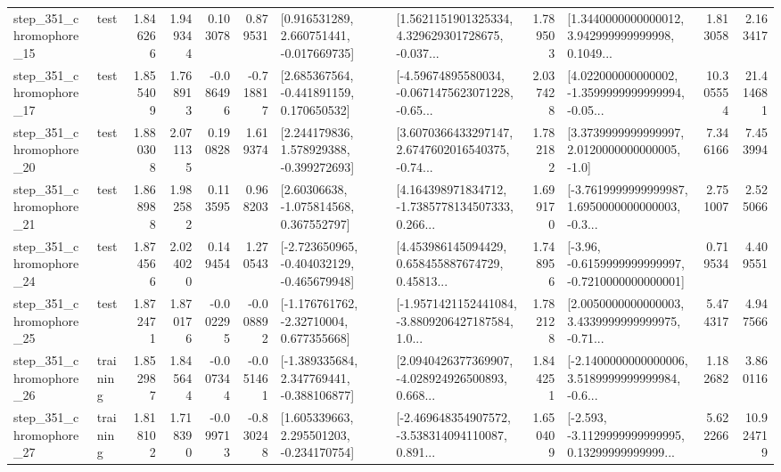 \begin{tabular}{llrrrrllrlrr}
  step\_351\_chromophore\_15 &      test &      1.846266 &    1.949344 &      0.103078 &  0.879531 &    [0.916531289, 2.660751441, -0.017669735] &  [1.5621151901325334, 4.329629301728675, -0.037... &       1.789503 &  [1.3440000000000012, 3.942999999999998, 0.1049... &            1.813058 &          2.163417 \\
  step\_351\_chromophore\_17 &      test &      1.855409 &    1.768913 &     -0.086496 & -0.718817 &    [2.685367564, -0.441891159, 0.170650532] &  [-4.59674895580034, -0.0671475623071228, -0.65... &       2.037428 &  [4.022000000000002, -1.3599999999999994, -0.05... &           10.305554 &         21.414681 \\
  step\_351\_chromophore\_20 &      test &      1.880308 &    2.071135 &      0.190828 &  1.619374 &    [2.244179836, 1.578929388, -0.399272693] &  [3.6070366433297147, 2.6747602016540375, -0.74... &       1.782182 &     [3.3739999999999997, 2.0120000000000005, -1.0] &            7.346166 &          7.453994 \\
  step\_351\_chromophore\_21 &      test &      1.868988 &    1.982582 &      0.113595 &  0.968203 &     [2.60306638, -1.075814568, 0.367552797] &  [4.164398971834712, -1.7385778134507333, 0.266... &       1.699170 &  [-3.7619999999999987, 1.6950000000000003, -0.3... &            2.751007 &          2.525066 \\
  step\_351\_chromophore\_24 &      test &      1.874566 &    2.024020 &      0.149454 &  1.270543 &  [-2.723650965, -0.404032129, -0.465679948] &  [4.453986145094429, 0.658455887674729, 0.45813... &       1.748956 &  [-3.96, -0.6159999999999997, -0.7210000000000001] &            0.719534 &          4.409551 \\
  step\_351\_chromophore\_25 &      test &      1.872471 &    1.870176 &     -0.002295 & -0.008892 &    [-1.176761762, -2.32710004, 0.677355668] &  [-1.9571421152441084, -3.8809206427187584, 1.0... &       1.782128 &  [2.0050000000000003, 3.4339999999999975, -0.71... &            5.474317 &          4.947566 \\
  step\_351\_chromophore\_26 &  training &      1.852987 &    1.845644 &     -0.007344 & -0.051461 &   [-1.389335684, 2.347769441, -0.388106877] &  [2.0940426377369907, -4.028924926500893, 0.668... &       1.844251 &  [-2.1400000000000006, 3.5189999999999984, -0.6... &            1.182682 &          3.860116 \\
  step\_351\_chromophore\_27 &  training &      1.818102 &    1.718390 &     -0.099713 & -0.830248 &    [1.605339663, 2.295501203, -0.234170754] &  [-2.469648354907572, -3.538314094110087, 0.891... &       1.650409 &  [-2.593, -3.1129999999999995, 0.13299999999999... &            5.622266 &         10.924719 \\

\end{tabular}

